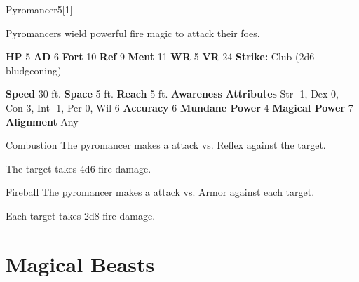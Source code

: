   \begin{monsection}{Pyromancer}{5}[1]
    \vspace{-1em}\vspace{-1em}
    \vspace{0em}

    
      Pyromancers wield powerful fire magic to attack their foes.
    
    

    \begin{spellcontent}
      \begin{spelltargetinginfo}
        \pari \textbf{HP} 5 \monsep
          \textbf{AD} 6 \monsep
          \textbf{Fort} 10 \monsep
          \textbf{Ref} 9 \monsep
          \textbf{Ment} 11
        \pari \textbf{WR} 5 \monsep
        \textbf{VR} 24
        \pari \textbf{Strike:}
            Club  (2d6 bludgeoning)
      \end{spelltargetinginfo}
    \end{spellcontent}
    \begin{monsterfooter}
      \pari \textbf{Speed} 30 ft. \monsep
        \textbf{Space} 5 ft. \monsep
        \textbf{Reach} 5 ft.
      \pari \textbf{Awareness} 
      \pari \textbf{Attributes}
        Str -1, Dex 0,
        Con 3, Int -1,
        Per 0, Wil 6
      \pari \textbf{Accuracy} 6 \monsep
        \textbf{Mundane Power} 4 \monsep
      \textbf{Magical Power} 7
      \pari \textbf{Alignment} Any
    \end{monsterfooter}
  \end{monsection}
  \begin{freeability}{Combustion}
       The pyromancer makes a  attack
        vs. Reflex against the target.
    
    \hit The target takes 4d6 fire damage.
    \end{freeability}
  

    \begin{freeability}{Fireball}
       The pyromancer makes a  attack
        vs. Armor against each target.
    
    \hit Each target takes 2d8 fire damage.
    \end{freeability}
  
        \section{Magical Beasts}


